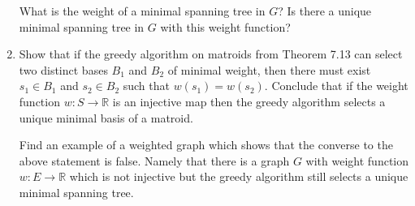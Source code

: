 \documentclass[12pt,
               a4paper,
               article,
               oneside,
               oldfontcommands,
               UKenglish]{memoir}
\begin{document}
\begin{problem}
\begin{enumerate}
What is the weight of a  minimal spanning tree in $G$?
Is there a unique minimal spanning tree in $G$ with this weight function?

\item Show that if the greedy algorithm on matroids from Theorem 7.13  can select two distinct bases  $B_1$ and  $B_2$ of minimal weight, then there must exist
$s_1 \in B_1$ and $s_2 \in B_2$ such that $w(s_1) = w(s_2)$.
Conclude that if the weight function $w : S \to \mathbb{R}$  is an injective  map then the greedy algorithm selects a unique minimal basis of a matroid.

Find an example of a weighted graph which shows that the converse to the above statement is false. Namely that there is a graph $G$ with weight function  $w : E \to \mathbb{R}$  which is not injective but the greedy algorithm still selects a unique minimal spanning tree.


\end{enumerate}

\end{problem}
\newpage
\end{document}
